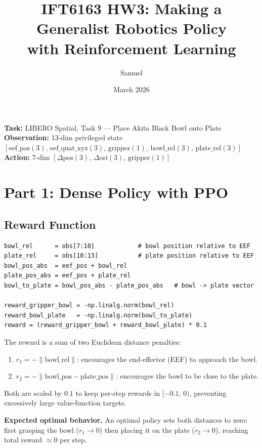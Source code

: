 \documentclass[11pt,letterpaper]{article}
\title{\textbf{IFT6163 HW3: Making a Generalist Robotics Policy\\with Reinforcement Learning}}
\author{Samuel}
\date{March 2026}
\begin{document}
\maketitle

\textbf{Task:} LIBERO Spatial, Task 9 — Place Akita Black Bowl onto Plate\\
\textbf{Observation:} 13-dim privileged state $[\text{eef\_pos}(3),\,\text{eef\_quat\_xyz}(3),\,\text{gripper}(1),\,\text{bowl\_rel}(3),\,\text{plate\_rel}(3)]$\\
\textbf{Action:} 7-dim $[\Delta\text{pos}(3),\,\Delta\text{ori}(3),\,\text{gripper}(1)]$

\section{Part 1: Dense Policy with PPO}

\subsection{Reward Function}

\begin{lstlisting}
bowl_rel      = obs[7:10]            # bowl position relative to EEF
plate_rel     = obs[10:13]           # plate position relative to EEF
bowl_pos_abs  = eef_pos + bowl_rel
plate_pos_abs = eef_pos + plate_rel
bowl_to_plate = bowl_pos_abs - plate_pos_abs   # bowl -> plate vector

reward_gripper_bowl = -np.linalg.norm(bowl_rel)
reward_bowl_plate   = -np.linalg.norm(bowl_to_plate)
reward = (reward_gripper_bowl + reward_bowl_plate) * 0.1
\end{lstlisting}

The reward is a sum of two Euclidean distance penalties:
\begin{enumerate}
  \item $r_1 = -\|\text{bowl\_rel}\|$: encourages the end-effector (EEF) to approach the bowl.
  \item $r_2 = -\|\text{bowl\_pos} - \text{plate\_pos}\|$: encourages the bowl to be close to the plate.
\end{enumerate}
Both are scaled by $0.1$ to keep per-step rewards in $[-0.1,\,0)$, preventing excessively large value-function targets.

\textbf{Expected optimal behavior.} An optimal policy sets both distances to zero: first grasping the bowl ($r_1 \to 0$) then placing it on the plate ($r_2 \to 0$), reaching total reward $\approx 0$ per step.
\end{document}
